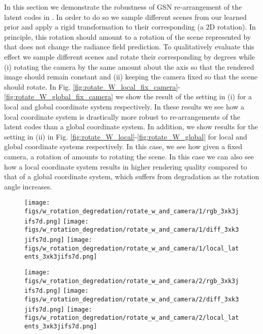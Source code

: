 \documentclass[10pt,twocolumn,letterpaper]{article}
\begin{document}
In this section we demonstrate the robustness of GSN \wrt re-arrangement of the latent codes in . In order to do so we sample different scenes from our learned prior and apply a rigid transformation to their corresponding  (a 2D rotation). In principle, this rotation should amount to a rotation of the scene represented by  that does not change the radiance field prediction. To qualitatively evaluate this effect we sample different scenes and rotate their corresponding  by  degrees while (i) rotating the camera by the same amount about the axis so that the rendered image should remain constant and (ii) keeping the camera fixed so that the scene should rotate. In Fig. \ref{fig:rotate_W_local_fix_camera}-\ref{fig:rotate_W_global_fix_camera} we show the result of the setting in (i) for a local and global coordinate system respectively. In these results we see how a local coordinate system is drastically more robust to re-arrangements of the latent codes than a global coordinate system. In addition, we show results for the setting in (ii) in Fig. \ref{fig:rotate_W_local}-\ref{fig:rotate_W_global} for local and global coordinate systems respectively. In this case, we see how given a fixed camera, a rotation of  amounts to rotating the scene. In this case we can also see how a local coordinate system results in higher rendering quality compared to that of a global coordinate system, which suffers from degradation as the rotation angle increases.


\begin{figure*}[h]
	\centering
	\begin{subfigure}{0.49\linewidth}
		\centering
		\texttt{[image: figs/w\_rotation\_degredation/rotate\_w\_and\_camera/1/rgb\_3xk3jifs7d.png]}
		\texttt{[image: figs/w\_rotation\_degredation/rotate\_w\_and\_camera/1/diff\_3xk3jifs7d.png]}
		\texttt{[image: figs/w\_rotation\_degredation/rotate\_w\_and\_camera/1/local\_latents\_3xk3jifs7d.png]}
	\end{subfigure} \hfill
	\begin{subfigure}{0.49\linewidth}
		\centering
		\texttt{[image: figs/w\_rotation\_degredation/rotate\_w\_and\_camera/2/rgb\_3xk3jifs7d.png]}
		\texttt{[image: figs/w\_rotation\_degredation/rotate\_w\_and\_camera/2/diff\_3xk3jifs7d.png]}
		\texttt{[image: figs/w\_rotation\_degredation/rotate\_w\_and\_camera/2/local\_latents\_3xk3jifs7d.png]}
	\end{subfigure}
	\caption{Change in generation output as local latent codes are rotated with a \textit{local} coordinate system for two different scenes. (Top) Rendered image. (Middle) Residual  degree rotation. (Bottom) Visualization of . Each column corresponds to a rotation of the camera and  in .}
	\label{fig:rotate_W_local_fix_camera}
\end{figure*}
\end{document}
